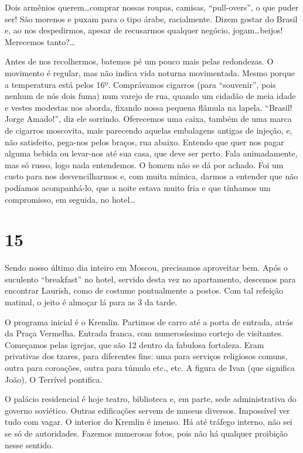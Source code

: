 Dois armênios querem\ldots comprar nossas roupas, camisas, ``pull-overs'', o que puder ser! São morenos e puxam para o tipo árabe, racialmente. Dizem gostar do Brasil e, ao nos despedirmos, apesar de recusarmos qualquer negócio, jogam\ldots beijos! Merecemos tanto?\ldots

Antes de nos recolhermos, batemos pé um pouco mais pelas redondezas. O movimento é regular, mas não indica vida noturna movimentada. Mesmo porque a temperatura está pelos 16º. Comprávamos cigarros (para ``souvenir'', pois nenhum de nós dois fuma) num varejo de rua, quando um cidadão de meia idade e vestes modestas nos aborda, fixando nossa pequena flâmula na lapela. ``Brasil! Jorge Amado!'', diz ele sorrindo. Oferecemos uma caixa, também de uma marca de cigarros moscovita, mais parecendo aquelas embalagens antigas de injeção, e, não satisfeito, pega-nos pelos braços, rua abaixo. Entendo que quer nos pagar alguma bebida ou levar-nos até sua casa, que deve ser perto. Fala animadamente, mas só russo, logo nada entendemos. O homem não se dá por achado. Foi um custo para nos desvencilharmos e, com muita mímica, darmos a entender que não podíamos acompanhá-lo, que a noite estava muito fria e que tínhamos um compromisso, em seguida, no hotel\ldots

\section*{15 \adfflatleafright {}}
Sendo nosso último dia inteiro em Moscou, precisamos aproveitar bem. Após o suculento ``breakfast'' no hotel, servido desta vez no apartamento, descemos para encontrar Laurish, como de costume pontualmente a postos. Com tal refeição matinal, o jeito é almoçar lá para as 3 da tarde.

O programa inicial é o Kremlin. Partimos de carro até a porta de entrada, atrás da Praça Vermelha. Entrada franca, com numerosíssimo cortejo de visitantes. Começamos pelas igrejas, que são 12 dentro da fabulosa fortaleza. Eram privativas dos tzares, para diferentes fins: uma para serviços religiosos comuns, outra para coroações, outra para túmulo etc., etc. A figura de Ivan (que significa João), O Terrível pontifica.

O palácio residencial é hoje teatro, biblioteca e, em parte, sede administrativa do governo soviético. Outras edificações servem de museus diversos. Impossível ver tudo com vagar. O interior do Kremlin é imenso. Há até tráfego interno, não sei se só de autoridades. Fazemos numerosas fotos, pois não há qualquer proibição nesse sentido.

